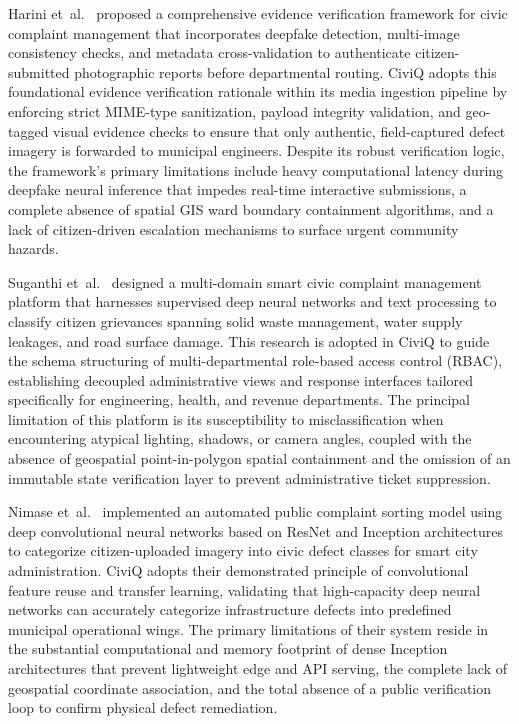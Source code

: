 \documentclass[12pt,a4paper]{report}
\begin{document}
Harini et~al.~\cite{ref_harini2026_evidence} proposed a comprehensive evidence verification framework for civic complaint management that incorporates deepfake detection, multi-image consistency checks, and metadata cross-validation to authenticate citizen-submitted photographic reports before departmental routing. CiviQ adopts this foundational evidence verification rationale within its media ingestion pipeline by enforcing strict MIME-type sanitization, payload integrity validation, and geo-tagged visual evidence checks to ensure that only authentic, field-captured defect imagery is forwarded to municipal engineers. Despite its robust verification logic, the framework's primary limitations include heavy computational latency during deepfake neural inference that impedes real-time interactive submissions, a complete absence of spatial GIS ward boundary containment algorithms, and a lack of citizen-driven escalation mechanisms to surface urgent community hazards.

Suganthi et~al.~\cite{ref_suganthi2026_smartcivic} designed a multi-domain smart civic complaint management platform that harnesses supervised deep neural networks and text processing to classify citizen grievances spanning solid waste management, water supply leakages, and road surface damage. This research is adopted in CiviQ to guide the schema structuring of multi-departmental role-based access control (RBAC), establishing decoupled administrative views and response interfaces tailored specifically for engineering, health, and revenue departments. The principal limitation of this platform is its susceptibility to misclassification when encountering atypical lighting, shadows, or camera angles, coupled with the absence of geospatial point-in-polygon spatial containment and the omission of an immutable state verification layer to prevent administrative ticket suppression.

Nimase et~al.~\cite{ref_nimase2021_complaintsorting} implemented an automated public complaint sorting model using deep convolutional neural networks based on ResNet and Inception architectures to categorize citizen-uploaded imagery into civic defect classes for smart city administration. CiviQ adopts their demonstrated principle of convolutional feature reuse and transfer learning, validating that high-capacity deep neural networks can accurately categorize infrastructure defects into predefined municipal operational wings. The primary limitations of their system reside in the substantial computational and memory footprint of dense Inception architectures that prevent lightweight edge and API serving, the complete lack of geospatial coordinate association, and the total absence of a public verification loop to confirm physical defect remediation.
\end{document}
